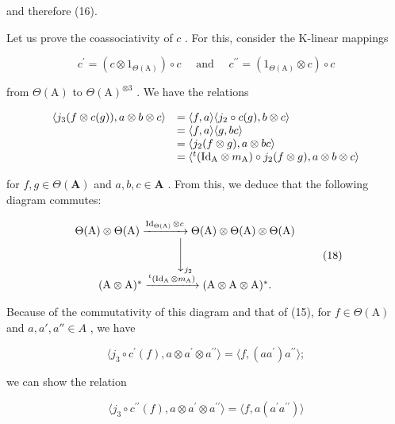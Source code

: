 and therefore (16).

Let us prove the coassociativity of \(c\) . For this, consider the K-linear mappings

\[
c ^ {\prime} = \left(c \otimes 1 _ {\Theta (\mathrm{A})}\right) \circ c \quad \text { and } \quad c ^ {\prime \prime} = \left(1 _ {\Theta (\mathrm{A})} \otimes c\right) \circ c
\]

from \(\Theta (\mathrm{A})\) to \(\Theta (\mathrm{A})^{\otimes 3}\) . We have the relations

\[
\begin{array}{r l} \langle j _ {3} (f \otimes c (g)), a \otimes b \otimes c \rangle & = \langle f, a \rangle \langle j _ {2} \circ c (g), b \otimes c \rangle \\ & = \langle f, a \rangle \langle g, b c \rangle \\ & = \langle j _ {2} (f \otimes g), a \otimes b c \rangle \\ & = \langle^ {t} (\mathrm{Id} _ {\mathrm{A}} \otimes m _ {\mathrm{A}}) \circ j _ {2} (f \otimes g), a \otimes b \otimes c \rangle \end{array}
\]

for \(f, g \in \Theta(\mathbf{A})\) and \(a, b, c \in \mathbf{A}\) . From this, we deduce that the following diagram commutes:

\[
\begin{array}{c} \Theta (\mathrm{A}) \otimes \Theta (\mathrm{A}) \xrightarrow {\operatorname{Id} _ {\Theta (\mathrm{A})} \otimes c} \Theta (\mathrm{A}) \otimes \Theta (\mathrm{A}) \otimes \Theta (\mathrm{A}) \\ \Biggl \downarrow_ {j _ {2}} \\ (\mathrm{A} \otimes \mathrm{A}) ^ {*} \xrightarrow {^ t (\operatorname{Id} _ {\mathrm{A}} \otimes m _ {\mathrm{A}})} (\mathrm{A} \otimes \mathrm{A} \otimes \mathrm{A}) ^ {*}. \end{array}\tag{18}
\]

Because of the commutativity of this diagram and that of (15), for \(f \in \Theta(\mathrm{A})\) and \(a, a', a'' \in A\) , we have

\[
\langle j _ {3} \circ c ^ {\prime} (f), a \otimes a ^ {\prime} \otimes a ^ {\prime \prime} \rangle = \langle f, (a a ^ {\prime}) a ^ {\prime \prime} \rangle ;
\]

we can show the relation

\[
\langle j _ {3} \circ c ^ {\prime \prime} (f), a \otimes a ^ {\prime} \otimes a ^ {\prime \prime} \rangle = \langle f, a (a ^ {\prime} a ^ {\prime \prime}) \rangle
\]

